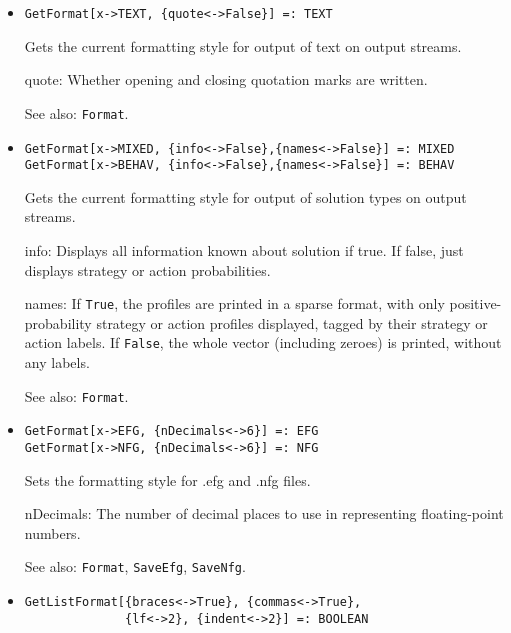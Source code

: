 \begin{itemize}
\item{}
\protect \large \begin{verbatim}
GetFormat[x->TEXT, {quote<->False}] =: TEXT 
\end{verbatim} \normalsize

\bd
Gets the current formatting style for output of text on output streams.
\bd
\item [quote:] Whether opening and closing quotation marks are
written. 
\ed
\item [See also:] \verb+Format+.
\ed


\item{}
\protect \large \begin{verbatim}
GetFormat[x->MIXED, {info<->False},{names<->False}] =: MIXED
GetFormat[x->BEHAV, {info<->False},{names<->False}] =: BEHAV
\end{verbatim} \normalsize

\bd Gets the current formatting style for output of solution types on
output streams.  
\bd
\item [info:] Displays all information known about solution if true. If false, just displays strategy or action probabilities.  
\item [names:] If \verb+True+, the profiles are printed in a sparse format,
with only positive-probability strategy or action profiles displayed, tagged
by their strategy or action labels.  If \verb+False+, the whole vector
(including zeroes) is printed, without any labels.
\ed
\item [See also:] \verb+Format+.
\ed

\item{}
\protect \large \begin{verbatim}
GetFormat[x->EFG, {nDecimals<->6}] =: EFG
GetFormat[x->NFG, {nDecimals<->6}] =: NFG
\end{verbatim} \normalsize

\bd
Sets the formatting style for .efg and .nfg files.
\bd
\item [nDecimals:] The number of decimal places to use in representing
floating-point numbers.
\ed
\item [See also:] \verb+Format+, \verb+SaveEfg+, \verb+SaveNfg+.
\ed

\item{}
\protect \large \begin{verbatim}
GetListFormat[{braces<->True}, {commas<->True},
              {lf<->2}, {indent<->2}] =: BOOLEAN 
\end{verbatim} \normalsize


\end{itemize}
